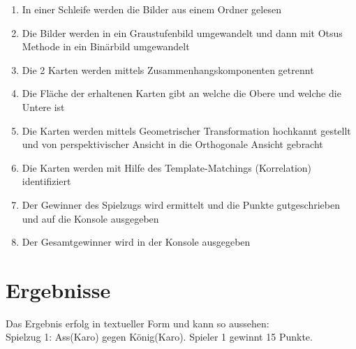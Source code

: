 \documentclass[deutsch]{scrartcl}
\begin{document}
\begin{enumerate}
	\item In einer Schleife werden die Bilder aus einem Ordner gelesen
	\item Die Bilder werden in ein Graustufenbild umgewandelt und dann mit Otsus Methode in ein Bin\"arbild umgewandelt
	\item Die 2 Karten werden mittels Zusammenhangskomponenten getrennt
	\item Die Fl\"ache der erhaltenen Karten gibt an welche die Obere und welche die Untere ist
	\item Die Karten werden mittels Geometrischer Transformation hochkannt gestellt und von perspektivischer Ansicht in die Orthogonale Ansicht gebracht
	\item Die Karten werden mit Hilfe des Template-Matchings (Korrelation) identifiziert
	\item Der Gewinner des Spielzugs wird ermittelt und die Punkte gutgeschrieben und auf die Konsole ausgegeben
	\item Der Gesamtgewinner wird in der Konsole ausgegeben

\end{enumerate}

\section*{Ergebnisse}

Das Ergebnis erfolg in textueller Form und kann so aussehen:\\
Spielzug 1: Ass(Karo) gegen K\"onig(Karo). Spieler 1 gewinnt 15 Punkte.\\
\end{document}
